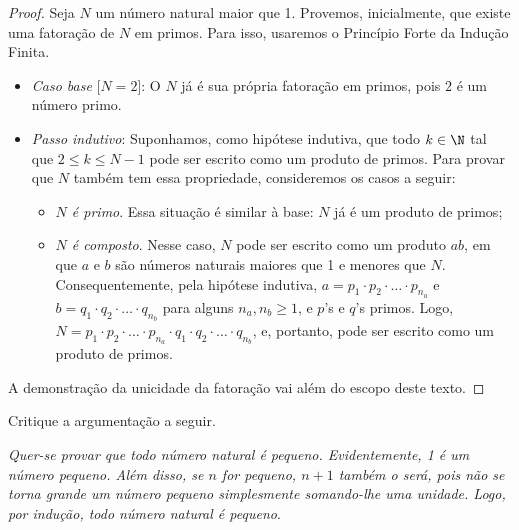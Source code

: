 \begin{proof}
  Seja $N$ um número natural maior que 1. 
  Provemos, inicialmente, que existe uma fatoração de $N$ em primos.
  Para isso, usaremos o Princípio Forte da Indução Finita.

  \begin{itemize}
    \item \emph{Caso base} [$N = 2$]: O $N$ já é sua própria fatoração em primos, pois $2$ é um número primo.
    \item \emph{Passo indutivo}: Suponhamos, como hipótese indutiva, que todo $k \in \N$ tal que $2 \le k \le N-1$ pode ser escrito como um produto de primos.
    Para provar que $N$ também tem essa propriedade, consideremos os casos a seguir:

    \begin{itemize}
      \item \emph{$N$ é primo}. Essa situação é similar à base: $N$ já é um produto de primos;
      \item \emph{$N$ é composto}. Nesse caso, $N$ pode ser escrito como um produto $ab$, em que $a$ e $b$ são números naturais maiores que 1 e menores que $N$.
      Consequentemente, pela hipótese indutiva, $a = p_1 \cdot p_2 \cdot \ldots \cdot p_{n_a}$ e $b = q_1 \cdot q_2 \cdot \ldots \cdot q_{n_b}$ para alguns $n_a, n_b \ge 1$, e $p$'s e $q$'s primos.
      Logo, $N = p_1 \cdot p_2 \cdot \ldots \cdot p_{n_a} \cdot q_1 \cdot q_2 \cdot \ldots \cdot q_{n_b}$, e, portanto, pode ser escrito como um produto de primos.
     \end{itemize}
  \end{itemize}
  
  A demonstração da unicidade da fatoração vai além do escopo deste texto. 

\end{proof}

\begin{example}
Critique a argumentação a seguir.

\textit{Quer-se provar que todo número natural é pequeno. Evidentemente, 1 é um número pequeno. Além disso, se $n$ for pequeno, $n+1$ também o será, pois não se torna grande um número pequeno simplesmente somando-lhe uma unidade. Logo, por indução, todo número natural é pequeno}.
\end{example}

